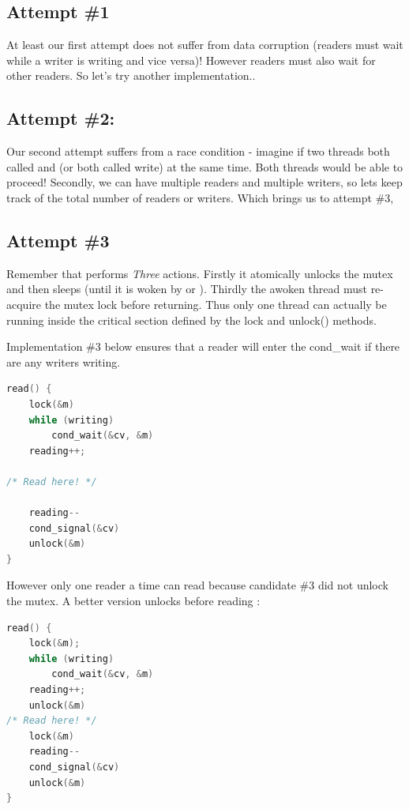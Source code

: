 \subsection{Attempt \#1}\label{attempt-1}

At least our first attempt does not suffer from data corruption (readers must wait while a writer is writing and vice versa)! However readers must also wait for other readers. So let's try another implementation..

\subsection{Attempt \#2:}\label{attempt-2}

Our second attempt suffers from a race condition - imagine if two threads both called  and  (or both called write) at the same time. Both threads would be able to proceed! Secondly, we can have multiple readers and multiple writers, so lets keep track of the total number of readers or writers. Which brings us to attempt \#3,

\subsection{Attempt \#3}\label{attempt-3}

Remember that  performs \emph{Three} actions. Firstly it atomically unlocks the mutex and then sleeps (until it is woken by  or ). Thirdly the awoken thread must re-acquire the mutex lock before returning. Thus only one thread can actually be running inside the critical section defined by the lock and unlock() methods.

Implementation \#3 below ensures that a reader will enter the cond\_wait if there are any writers writing.

\begin{lstlisting}[language=C]
read() {
    lock(&m)
    while (writing)
        cond_wait(&cv, &m)
    reading++;

/* Read here! */

    reading--
    cond_signal(&cv)
    unlock(&m)
}
\end{lstlisting}

However only one reader a time can read because candidate \#3 did not unlock the mutex. A better version unlocks before reading :

\begin{lstlisting}[language=C]
read() {
    lock(&m);
    while (writing)
        cond_wait(&cv, &m)
    reading++;
    unlock(&m)
/* Read here! */
    lock(&m)
    reading--
    cond_signal(&cv)
    unlock(&m)
}
\end{lstlisting}

